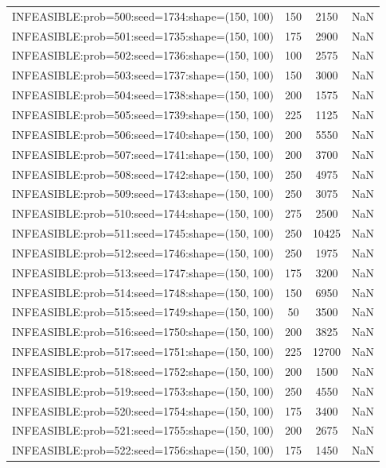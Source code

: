 \begin{longtable}{lccc}
INFEASIBLE:prob=500:seed=1734:shape=(150, 100) &      150 &  2150 &    NaN \\
INFEASIBLE:prob=501:seed=1735:shape=(150, 100) &      175 &  2900 &    NaN \\
INFEASIBLE:prob=502:seed=1736:shape=(150, 100) &      100 &  2575 &    NaN \\
INFEASIBLE:prob=503:seed=1737:shape=(150, 100) &      150 &  3000 &    NaN \\
INFEASIBLE:prob=504:seed=1738:shape=(150, 100) &      200 &  1575 &    NaN \\
INFEASIBLE:prob=505:seed=1739:shape=(150, 100) &      225 &  1125 &    NaN \\
INFEASIBLE:prob=506:seed=1740:shape=(150, 100) &      200 &  5550 &    NaN \\
INFEASIBLE:prob=507:seed=1741:shape=(150, 100) &      200 &  3700 &    NaN \\
INFEASIBLE:prob=508:seed=1742:shape=(150, 100) &      250 &  4975 &    NaN \\
INFEASIBLE:prob=509:seed=1743:shape=(150, 100) &      250 &  3075 &    NaN \\
INFEASIBLE:prob=510:seed=1744:shape=(150, 100) &      275 &  2500 &    NaN \\
INFEASIBLE:prob=511:seed=1745:shape=(150, 100) &      250 & 10425 &    NaN \\
INFEASIBLE:prob=512:seed=1746:shape=(150, 100) &      250 &  1975 &    NaN \\
INFEASIBLE:prob=513:seed=1747:shape=(150, 100) &      175 &  3200 &    NaN \\
INFEASIBLE:prob=514:seed=1748:shape=(150, 100) &      150 &  6950 &    NaN \\
INFEASIBLE:prob=515:seed=1749:shape=(150, 100) &       50 &  3500 &    NaN \\
INFEASIBLE:prob=516:seed=1750:shape=(150, 100) &      200 &  3825 &    NaN \\
INFEASIBLE:prob=517:seed=1751:shape=(150, 100) &      225 & 12700 &    NaN \\
INFEASIBLE:prob=518:seed=1752:shape=(150, 100) &      200 &  1500 &    NaN \\
INFEASIBLE:prob=519:seed=1753:shape=(150, 100) &      250 &  4550 &    NaN \\
INFEASIBLE:prob=520:seed=1754:shape=(150, 100) &      175 &  3400 &    NaN \\
INFEASIBLE:prob=521:seed=1755:shape=(150, 100) &      200 &  2675 &    NaN \\
INFEASIBLE:prob=522:seed=1756:shape=(150, 100) &      175 &  1450 &    NaN \\

\end{longtable}
